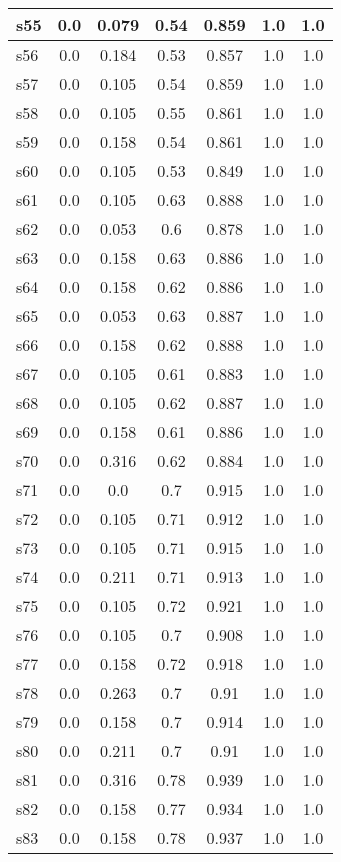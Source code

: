 \documentclass{article}
\begin{document}
\begin{tabular}{|l|c|c|c|c|c|c|}
s55 &0.0 & 0.079 & 0.54 & 0.859 & 1.0 & 1.0\\
\hline
s56 &0.0 & 0.184 & 0.53 & 0.857 & 1.0 & 1.0\\
\hline
s57 &0.0 & 0.105 & 0.54 & 0.859 & 1.0 & 1.0\\
\hline
s58 &0.0 & 0.105 & 0.55 & 0.861 & 1.0 & 1.0\\
\hline
s59 &0.0 & 0.158 & 0.54 & 0.861 & 1.0 & 1.0\\
\hline
s60 &0.0 & 0.105 & 0.53 & 0.849 & 1.0 & 1.0\\
\hline
s61 &0.0 & 0.105 & 0.63 & 0.888 & 1.0 & 1.0\\
\hline
s62 &0.0 & 0.053 & 0.6 & 0.878 & 1.0 & 1.0\\
\hline
s63 &0.0 & 0.158 & 0.63 & 0.886 & 1.0 & 1.0\\
\hline
s64 &0.0 & 0.158 & 0.62 & 0.886 & 1.0 & 1.0\\
\hline
s65 &0.0 & 0.053 & 0.63 & 0.887 & 1.0 & 1.0\\
\hline
s66 &0.0 & 0.158 & 0.62 & 0.888 & 1.0 & 1.0\\
\hline
s67 &0.0 & 0.105 & 0.61 & 0.883 & 1.0 & 1.0\\
\hline
s68 &0.0 & 0.105 & 0.62 & 0.887 & 1.0 & 1.0\\
\hline
s69 &0.0 & 0.158 & 0.61 & 0.886 & 1.0 & 1.0\\
\hline
s70 &0.0 & 0.316 & 0.62 & 0.884 & 1.0 & 1.0\\
\hline
s71 &0.0 & 0.0 & 0.7 & 0.915 & 1.0 & 1.0\\
\hline
s72 &0.0 & 0.105 & 0.71 & 0.912 & 1.0 & 1.0\\
\hline
s73 &0.0 & 0.105 & 0.71 & 0.915 & 1.0 & 1.0\\
\hline
s74 &0.0 & 0.211 & 0.71 & 0.913 & 1.0 & 1.0\\
\hline
s75 &0.0 & 0.105 & 0.72 & 0.921 & 1.0 & 1.0\\
\hline
s76 &0.0 & 0.105 & 0.7 & 0.908 & 1.0 & 1.0\\
\hline
s77 &0.0 & 0.158 & 0.72 & 0.918 & 1.0 & 1.0\\
\hline
s78 &0.0 & 0.263 & 0.7 & 0.91 & 1.0 & 1.0\\
\hline
s79 &0.0 & 0.158 & 0.7 & 0.914 & 1.0 & 1.0\\
\hline
s80 &0.0 & 0.211 & 0.7 & 0.91 & 1.0 & 1.0\\
\hline
s81 &0.0 & 0.316 & 0.78 & 0.939 & 1.0 & 1.0\\
\hline
s82 &0.0 & 0.158 & 0.77 & 0.934 & 1.0 & 1.0\\
\hline
s83 &0.0 & 0.158 & 0.78 & 0.937 & 1.0 & 1.0\\

\end{tabular}
\end{document}
